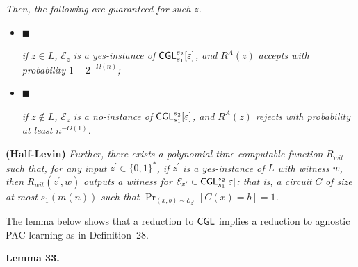 \documentclass[10pt,a4paper]{article}
\begin{document}
\emph{Then, the following are guaranteed for such }$z$\emph{.}\par


\begin{itemize}


\item[] 
$\blacksquare$ 


\emph{if }$z\in L$\emph{, }$\mathcal{E}_{z}$\emph{ is a yes-instance of }${\sf CGL}_{s_{1}}^{s_{2}}[\varepsilon]$\emph{, and }$R^{A}(z)$\emph{ accepts with probability }$1-2^{-\Omega(n)}$\emph{;}\par





\item[] 
$\blacksquare$ 


\emph{if }$z\notin L$\emph{, }$\mathcal{E}_{z}$\emph{ is a no-instance of }${\sf CGL}_{s_{1}}^{s_{2}}[\varepsilon]$\emph{, and }$R^{A}(z)$\emph{ rejects with probability at least }$n^{-O(1)}$\emph{.}\par





\end{itemize}




\textbf{(Half-Levin)}\emph{ Further, there exists a polynomial-time computable function }$R_{wit}$\emph{ such that, for any input }$z^{\prime}\in\{0,1\}^{*}$\emph{, if }$z^{\prime}$\emph{ is a yes-instance of }$L$\emph{ with witness }$w$\emph{, then }$R_{wit}(z^{\prime},w)$\emph{ outputs a witness for }$\mathcal{E}_{z^{\prime}}\in{\sf CGL}_{s_{1}}^{s_{2}}[\varepsilon]$\emph{: that is, a circuit }$C$\emph{ of size at most }$s_{1}(m(n))$\emph{ such that }$\Pr_{(x,b)\sim\mathcal{E}_{z^{\prime}}}[C(x)=b]=1$\emph{.}\par






The lemma below shows that a reduction to ${\sf CGL}$ implies a reduction to agnostic PAC learning as in Definition 28.\par





\par\medskip\noindent\textbf{
\textbf{Lemma 33}\textbf{.}
}\par
\end{document}
